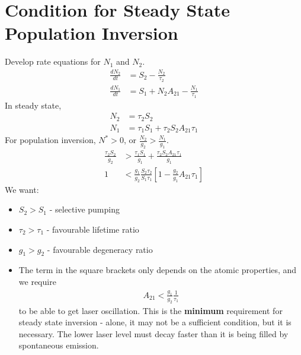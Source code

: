 \documentclass[a4paper, 11pt, normalem]{report}
\begin{document}
\section{Condition for Steady State Population Inversion}
\begin{figure}[H]
    \centering
    \vspace{-25pt}
\end{figure}
Develop rate equations for $N_1$ and $N_2$.
\begin{align}
    \frac{dN_2}{dt} &= S_2 - \frac{N_2}{\tau_2} \\
    \frac{dN_1}{dt} &= S_1 + N_2A_{21} - \frac{N_1}{\tau_1} 
\end{align}
In steady state, 
\begin{align}
    N_2 &= \tau_2S_2 \\
    N_1 &= \tau_1S_1 + \tau_2S_2A_{21}\tau_1
\end{align}
For population inversion, $N^* > 0$, or $\frac{N_2}{g_2} > \frac{N_1}{g_1}$.
\begin{align}
    \frac{\tau_2S_2}{g_2} &> \frac{\tau_1S_1}{g_1} + \frac{\tau_2S_2A_{21}\tau_1}{g_1} \\
    1 &< \frac{g_1}{g_2}\frac{S_2\tau_2}{S_1\tau_1}\left[1-\frac{g_2}{g_1}A_{21}\tau_1\right]
\end{align}
We want:
\begin{itemize}
    \item $S_2 > S_1$ - selective pumping
    \item $\tau_2 > \tau_1$ - favourable lifetime ratio
    \item $g_1 > g_2$ - favourable degeneracy ratio
    \item The term in the square brackets only depends on the atomic properties, and we require
        \begin{align}
            A_{21} < \frac{g_1}{g_2}\frac{1}{\tau_1}
        \end{align}
        to be able to get laser oscillation.
        This is the \textbf{minimum} requirement for steady state inversion - alone, it may not be a sufficient condition, but it is necessary.
        The lower laser level must decay faster than it is being filled by spontaneous emission.
\end{itemize}
\end{document}
